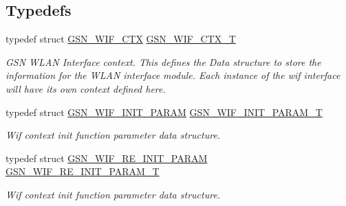 \subsection*{Typedefs}
\begin{DoxyCompactItemize}
\item 
typedef struct \hyperlink{a00323}{GSN\_\-WIF\_\-CTX} \hyperlink{a00635_ga7a8bd94a4326b0ff61696008eda89228}{GSN\_\-WIF\_\-CTX\_\-T}
\begin{DoxyCompactList}\small\item\em GSN WLAN Interface context. This defines the Data structure to store the information for the WLAN interface module. Each instance of the wif interface will have its own context defined here. \end{DoxyCompactList}\item 
typedef struct \hyperlink{a00338}{GSN\_\-WIF\_\-INIT\_\-PARAM} \hyperlink{a00635_gaf24820ac43e65f03340551f2b579f6f5}{GSN\_\-WIF\_\-INIT\_\-PARAM\_\-T}
\begin{DoxyCompactList}\small\item\em Wif context init function parameter data structure. \end{DoxyCompactList}\item 
typedef struct \hyperlink{a00342}{GSN\_\-WIF\_\-RE\_\-INIT\_\-PARAM} \hyperlink{a00635_ga3af1a4583d80b21b8aa4274a01ca7ad7}{GSN\_\-WIF\_\-RE\_\-INIT\_\-PARAM\_\-T}
\begin{DoxyCompactList}\small\item\em Wif context init function parameter data structure. \end{DoxyCompactList}\end{DoxyCompactItemize}
